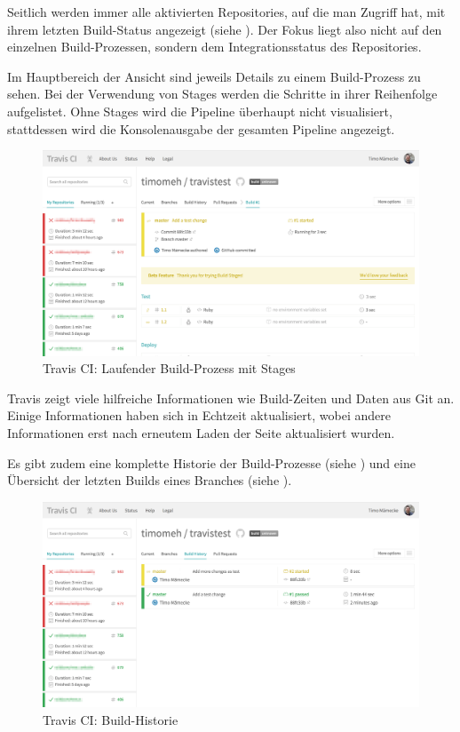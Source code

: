 Seitlich werden immer alle aktivierten Repositories, auf die man Zugriff hat, mit ihrem letzten Build-Status angezeigt (siehe ). Der Fokus liegt also nicht auf den einzelnen Build-Prozessen, sondern dem Integrationsstatus des Repositories.

Im Hauptbereich der Ansicht sind jeweils Details zu einem Build-Prozess zu sehen. Bei der Verwendung von Stages werden die Schritte in ihrer Reihenfolge aufgelistet. Ohne Stages wird die Pipeline überhaupt nicht visualisiert, stattdessen wird die Konsolenausgabe der gesamten Pipeline angezeigt.

\begin{figure}[h]
  \caption{Travis CI: Laufender Build-Prozess mit Stages}
  \label{fig:travis-running-build}
  \includegraphics[width=.8\textwidth]{assets/travis-running-build}
\end{figure}

Travis zeigt viele hilfreiche Informationen wie Build-Zeiten und Daten aus Git an. Einige Informationen haben sich in Echtzeit aktualisiert, wobei andere Informationen erst nach erneutem Laden der Seite aktualisiert wurden.

Es gibt zudem eine komplette Historie der Build-Prozesse (siehe ) und eine Übersicht der letzten Builds eines Branches (siehe ).

\begin{figure}[h]
  \caption{Travis CI: Build-Historie}
  \label{fig:travis-history}
  \includegraphics[width=.8\textwidth]{assets/travis-history}
\end{figure}

